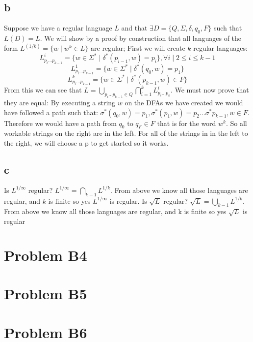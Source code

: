 \documentclass[12pt]{article}
\begin{document}
\subsection*{b}
Suppose we have a regular language $L$ and that $\exists    D = \{Q, \Sigma, \delta, q_0, F\}$ such that $L(D) = L$. We will show by a proof by construction that all languages of the form $L^{(1/k)} = \{ w \mid w^k \in L\}$ are regular;
\newline First we will create $k$ regular languages:
$$L^i_{p_i...p_{k-1}} = \{ w \in \Sigma^* \mid \delta^*(p_{i-1},w) = p_i\}, \forall i \mid 2 \le i \le k-1 $$
$$L^1_{p_i...p_{k-1}} = \{ w \in \Sigma^* \mid \delta^*(q_0,w) = p_1\}$$
$$L^k_{p_i...p_{k-1}} = \{ w \in \Sigma^* \mid \delta^*(p_{k-1},w) \in F\}$$
From this we can see that $L = \bigcup_{p_i...p_{k-1} \in Q} \bigcap^k_{i=1} L^i_{p_i...p_k}$. We must now prove that they are equal: \newline
By executing a string $w$ on the DFAs we have created we would have followed a path such that: $\sigma^*(q_0,w) = p_1 , \sigma^*(p_1, w) = p_2 ... \sigma^*{p_{k-1}, w} \in F$.  Therefore we would have a path from $q_0$ to $q_F \in F$ that is for the word $w^k$. So all workable strings on the right are in the left.
\newline For all of the strings in in the left to the right, we will choose a p to get started so it works.
\subsection*{c}
Is $L^{1/\infty}$ regular? $L^{1/\infty} = \bigcap_{k-1}L^{1/k}$.  From above we know all those languages are regular, and $k$ is finite so yes $L^{1/\infty}$ is regular.\newline
Is $\sqrt{L}$ regular? $\sqrt{L} = \bigcup_{k-1}L^{1/k}$.  From above we know all those languages are regular, and k is finite so yes $\sqrt{L}$ is regular

\section*{Problem B4}

\section*{Problem B5}

\section*{Problem B6}
\end{document}

